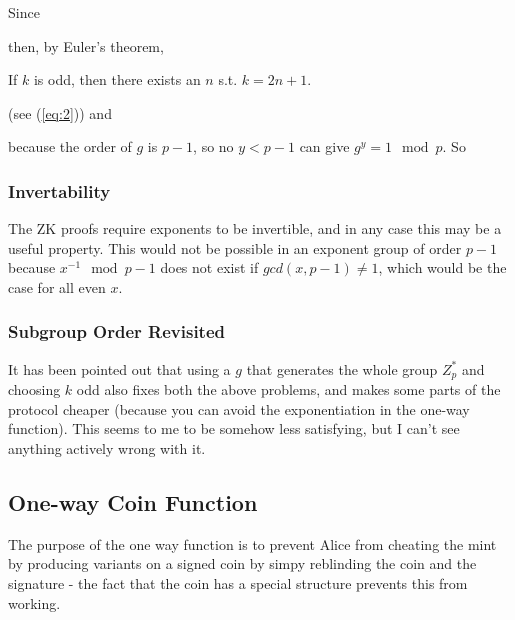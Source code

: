 \documentclass[a4paper,titlepage]{article}
\begin{document}

Since


then, by Euler's theorem, 


If $k$ is odd, then there exists an $n$ s.t. $k=2n+1$.



(see (\ref{eq:2})) and


because the order of $g$ is $p-1$, so no $y < p-1$ can give $g^y=1
 \mod p$. So


\subsubsection{Invertability}

The ZK proofs require exponents to be invertible, and in any case this
may be a useful property. This would not be possible in an exponent
group of order $p-1$ because $x^{-1}
\mod{p-1}$ does not exist if $gcd(x,p-1) \neq 1$, which would be the
case for all even $x$.

\subsubsection{Subgroup Order Revisited}

It has been pointed out that using a $g$ that generates the whole
group $Z_p^*$ and choosing $k$ odd also fixes both the above problems,
and makes some parts of the protocol cheaper (because you can avoid
the exponentiation in the one-way function). This seems to me to be
somehow less satisfying, but I can't see anything actively wrong with
it.

\subsection{One-way Coin Function}
\label{sec:oneway}

The purpose of the one way function is to prevent Alice from cheating
the mint by producing variants on a signed coin by simpy reblinding
the coin and the signature - the fact that the coin has a special
structure prevents this from working.
\end{document}
